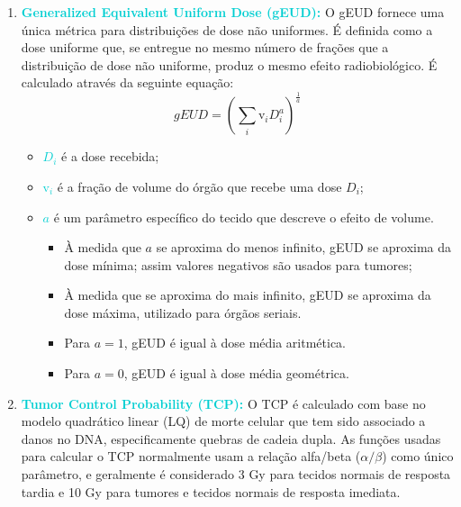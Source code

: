 \documentclass[11pt,a4paper]{article}
\newcounter{exemplo}
\begin{document}
	\begin{enumerate}
		\item \textcolor{DarkTurquoise}{\textbf{Generalized Equivalent Uniform Dose (gEUD):}} O gEUD fornece uma única métrica para distribuições de dose não uniformes. É definida como a dose uniforme que, se entregue no mesmo número de frações que a distribuição de dose não uniforme, produz o mesmo efeito radiobiológico. É calculado através da seguinte equação:
			\begin{equation}
				gEUD = \left(\sum_i \mathrm{v}_i D_i^a\right)^{\frac{1}{a}}
			\end{equation}

			\begin{exemplo}[onde,]
				\begin{itemize}[label=\textcolor{CarnationPink}{$\blacksquare$}]
					\item \textcolor{DarkTurquoise}{\textbf{$D_i$}} é a dose recebida;
					\item \textcolor{DarkTurquoise}{\textbf{$\mathrm{v}_i$}} é a fração de volume do órgão que recebe uma dose $D_i$;
					\item \textcolor{DarkTurquoise}{\textbf{$a$}} é um parâmetro específico do tecido que descreve o efeito de volume.
						\begin{itemize}[label=\textcolor{CarnationPink}{$\star$}]
							\item À medida que $a$ se aproxima do menos infinito, gEUD se aproxima da dose mínima; assim valores negativos são usados para tumores;
					
							\item À medida que se aproxima do mais infinito, gEUD se aproxima da dose máxima, utilizado para órgãos seriais.
					
							\item Para $a = 1$, gEUD é igual à dose média aritmética.
					
							\item Para $a = 0$, gEUD é igual à dose média geométrica.
						\end{itemize}
				\end{itemize}
			\end{exemplo}

		\item \textcolor{DarkTurquoise}{\textbf{Tumor Control Probability (TCP):}} O TCP é calculado com base no modelo quadrático linear (LQ) de morte celular que tem sido associado a danos no DNA, especificamente quebras de cadeia dupla. As funções usadas para calcular o TCP normalmente usam a relação alfa/beta ($\alpha / \beta$) como único parâmetro, e geralmente é considerado 3 Gy para tecidos normais de resposta tardia e 10 Gy para tumores e tecidos normais de resposta imediata.
		

\end{enumerate}
\end{document}
